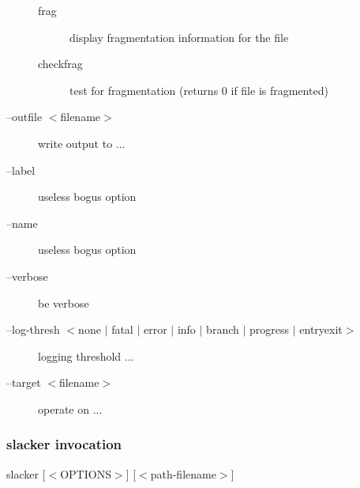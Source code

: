 \documentclass[letterpaper]{article}
\begin{document}
\begin{description}
\begin{description}
\item[frag] \mbox{}

display fragmentation information for the file

\item[checkfrag] \mbox{}

test for fragmentation (returns 0 if file is fragmented)

\end{description}


\item[--outfile $<$filename$>$] \mbox{}

write output to ...

\item[--label] \mbox{}

useless bogus option

\item[--name] \mbox{}

useless bogus option

\item[--verbose] \mbox{}

be verbose

\item[--log-thresh $<$none $|$ fatal $|$ error $|$ info $|$ branch $|$ progress $|$ entryexit$>$] \mbox{}

logging threshold ...

\item[--target $<$filename$>$] \mbox{}

operate on ...

\end{description}







\subsubsection{{\ttfamily slacker} invocation}

{\ttfamily slacker [$<$OPTIONS$>$] [$<$path-filename$>$]}
\end{document}
